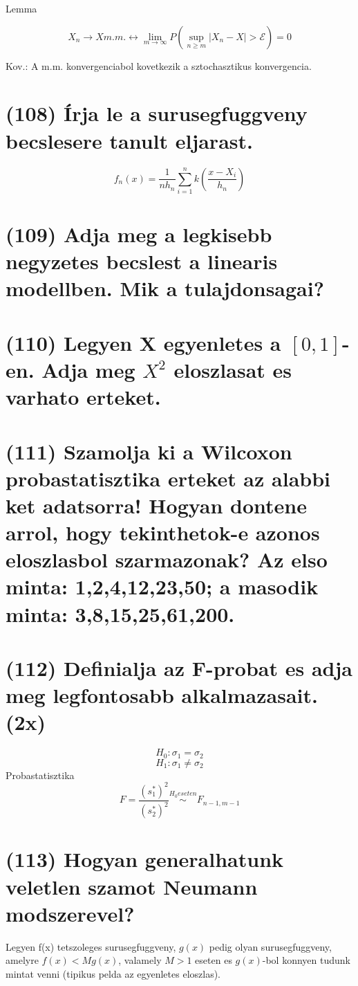 \documentclass[12p]{article}
\begin{document}
Lemma

$$X_n \rightarrow X m.m. \leftrightarrow \lim_{m \rightarrow \infty} P(\sup_{n \geq m} |X_n - X| > \mathcal{E}) = 0$$

Kov.: A m.m. konvergenciabol kovetkezik a
sztochasztikus konvergencia.


\section{(108) Írja le a surusegfuggveny becslesere tanult eljarast.}

$$f_n(x) = \frac{1}{nh_n}\sum^n_{i=1}k\left( \frac{x-X_i}{h_n} \right)$$

\section{(109) Adja meg a legkisebb negyzetes becslest a linearis modellben. Mik a tulajdonsagai?}

\section{(110) Legyen X egyenletes a $[0, 1]$-en. Adja meg $X^2$ eloszlasat es varhato erteket.}

\section{(111) Szamolja ki a Wilcoxon probastatisztika erteket az alabbi ket adatsorra! Hogyan dontene arrol, hogy tekinthetok-e azonos eloszlasbol szarmazonak? Az elso minta: 1,2,4,12,23,50;
a masodik minta: 3,8,15,25,61,200.}

\section{(112) Definialja az F-probat es adja meg legfontosabb alkalmazasait. (2x)}

$$H_0: \sigma_1 = \sigma_2$$
$$H_1: \sigma_1 \neq \sigma_2$$
Probastatisztika
$$F= \frac{(s_1^{*})^2}{(s_2^{*})^2} \stackrel{H_0 eseten}{\sim} F_{n-1,m-1}$$

\section{(113)  Hogyan generalhatunk veletlen szamot Neumann modszerevel?}

Legyen f(x) tetszoleges surusegfuggveny, $g(x)$ pedig olyan surusegfuggveny, amelyre $f(x) < Mg(x)$, valamely $M>1$ eseten es $g(x)$-bol konnyen tudunk mintat venni (tipikus pelda az egyenletes eloszlas).
\end{document}
